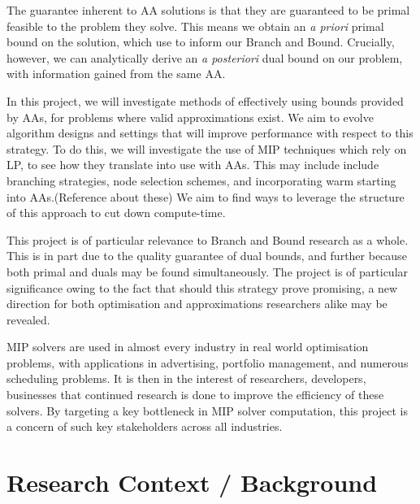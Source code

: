 \documentclass[12pt, a4paper]{article}
\begin{document}
The guarantee inherent to AA solutions is that they are guaranteed to be primal feasible to the problem they solve. This means we obtain an \emph{a priori} primal bound on the solution, which use to inform our Branch and Bound. Crucially, however, we can analytically derive an \emph{a posteriori} dual bound on our problem, with information gained from the same AA.

In this project, we will investigate methods of effectively using bounds provided by AAs, for problems where valid approximations exist. We aim to evolve algorithm designs and settings that will improve performance with respect to this strategy. To do this, we will investigate the use of MIP techniques which rely on LP, to see how they translate into use with AAs. This may include include branching strategies, node selection schemes, and incorporating warm starting into AAs.(Reference about these) We aim to find ways to leverage the structure of this approach to cut down compute-time.

This project is of particular relevance to Branch and Bound research as a whole. This is in part due to the quality guarantee of dual bounds, and further because both primal and duals may be found simultaneously. The project is of particular significance owing to the fact that should this strategy prove promising, a new direction for both optimisation and approximations researchers alike may be revealed. 

MIP solvers are used in almost every industry in real world optimisation problems, with applications in advertising, portfolio management, and numerous scheduling problems. It is then in the interest of researchers, developers, businesses that continued research is done to improve the efficiency of these solvers. By targeting a key bottleneck in MIP solver computation, this project is a concern of such key stakeholders across all industries. 

\section{Research Context / Background}
\end{document}
